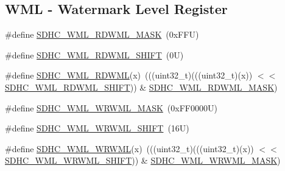 \subsection*{W\+ML -\/ Watermark Level Register}
\begin{DoxyCompactItemize}
\item 
\#define \mbox{\hyperlink{group___s_d_h_c___register___masks_gae6b31e76805f36f9903c70818642decc}{S\+D\+H\+C\+\_\+\+W\+M\+L\+\_\+\+R\+D\+W\+M\+L\+\_\+\+M\+A\+SK}}~(0x\+F\+F\+U)
\item 
\#define \mbox{\hyperlink{group___s_d_h_c___register___masks_gaccbe2485e8ba11877a5d0c45efef3cf5}{S\+D\+H\+C\+\_\+\+W\+M\+L\+\_\+\+R\+D\+W\+M\+L\+\_\+\+S\+H\+I\+FT}}~(0\+U)
\item 
\#define \mbox{\hyperlink{group___s_d_h_c___register___masks_gad9a5ef012064c89985cefc46d8b98614}{S\+D\+H\+C\+\_\+\+W\+M\+L\+\_\+\+R\+D\+W\+ML}}(x)~(((uint32\+\_\+t)(((uint32\+\_\+t)(x)) $<$$<$ \mbox{\hyperlink{group___s_d_h_c___register___masks_gaccbe2485e8ba11877a5d0c45efef3cf5}{S\+D\+H\+C\+\_\+\+W\+M\+L\+\_\+\+R\+D\+W\+M\+L\+\_\+\+S\+H\+I\+FT}})) \& \mbox{\hyperlink{group___s_d_h_c___register___masks_gae6b31e76805f36f9903c70818642decc}{S\+D\+H\+C\+\_\+\+W\+M\+L\+\_\+\+R\+D\+W\+M\+L\+\_\+\+M\+A\+SK}})
\item 
\#define \mbox{\hyperlink{group___s_d_h_c___register___masks_gabfe9926c62d373c8d28b1bcc7ba0010f}{S\+D\+H\+C\+\_\+\+W\+M\+L\+\_\+\+W\+R\+W\+M\+L\+\_\+\+M\+A\+SK}}~(0x\+F\+F0000\+U)
\item 
\#define \mbox{\hyperlink{group___s_d_h_c___register___masks_ga026a7e92688832bffea0905554f30253}{S\+D\+H\+C\+\_\+\+W\+M\+L\+\_\+\+W\+R\+W\+M\+L\+\_\+\+S\+H\+I\+FT}}~(16\+U)
\item 
\#define \mbox{\hyperlink{group___s_d_h_c___register___masks_gaab80c8d04a4c7c27fb4f5b24d1622945}{S\+D\+H\+C\+\_\+\+W\+M\+L\+\_\+\+W\+R\+W\+ML}}(x)~(((uint32\+\_\+t)(((uint32\+\_\+t)(x)) $<$$<$ \mbox{\hyperlink{group___s_d_h_c___register___masks_ga026a7e92688832bffea0905554f30253}{S\+D\+H\+C\+\_\+\+W\+M\+L\+\_\+\+W\+R\+W\+M\+L\+\_\+\+S\+H\+I\+FT}})) \& \mbox{\hyperlink{group___s_d_h_c___register___masks_gabfe9926c62d373c8d28b1bcc7ba0010f}{S\+D\+H\+C\+\_\+\+W\+M\+L\+\_\+\+W\+R\+W\+M\+L\+\_\+\+M\+A\+SK}})
\end{DoxyCompactItemize}

